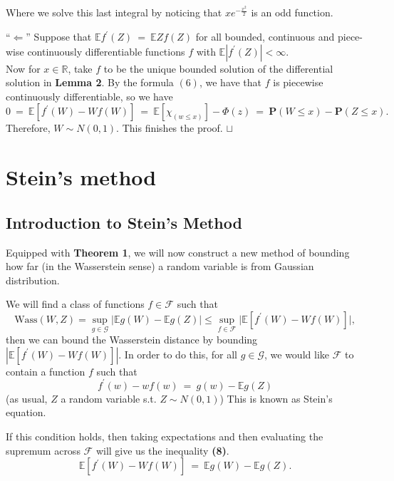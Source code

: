 \documentclass[12pt]{article}
\newcommand\qed{\hfill\hbox{\rlap{$\sqcap$}$\sqcup$}}
\newcommand{\eq }{\: = \:}
\theoremstyle{nonumberplain}
\begin{document}
Where we solve this last integral by noticing that $xe^{-\frac{x^2}{2}}$ is an odd function.

``$\Longleftarrow$'' Suppose that $\mathbb{E}f^{\prime}(Z)\eq \mathbb{E}Zf(Z)$ for all bounded, continuous and piece-wise continuously differentiable functions $f$ with $\mathbb{E}|f^{\prime}(Z)|<\infty$.\\
Now for $x \in \mathbb{R}$, take $f$ to be the unique bounded solution of the differential solution in \textbf{Lemma 2}. By the formula $(6)$, we have that $f$ is piecewise continuously differentiable, so we have 
$$
0\eq  \mathbb{E}[f^{\prime}(W)-Wf(W)] \eq  \mathbb{E}[\chi_{(w\leq x)}]-\Phi(z)\eq \textbf{P}(W\leq x)-\textbf{P}(Z\leq x).
$$
Therefore, $W\sim N(0,1)$. This finishes the proof.
\qed

\section{Stein's method}

\subsection{Introduction to Stein's Method}

Equipped with \textbf{Theorem 1}, we will now construct a new method of bounding how far (in the Wasserstein sense) a random variable is from Gaussian distribution.

We will find a class of functions $f\in \mathcal{F}$ such that 
\begin{equation}
\mathrm{Wass}(W, Z) = 
\sup \limits_{g\in \mathcal{G}} \bigl|\mathbb{E}g(W)-\mathbb{E}g(Z)\bigr|\leq \sup \limits_{f\in \mathcal{F}} \bigl|\mathbb{E}[f^{\prime}(W)-Wf(W)]\bigr|,
\end{equation}
then we can bound the Wasserstein distance by bounding $|\mathbb{E}[f^{\prime}(W)-Wf(W)]|$.
In order to do this, for all $g \in \mathcal{G}$, we would like $\mathcal{F}$ to contain a function $f$ such that
\begin{equation}
f^{\prime}(w)-wf(w)\eq g(w)-\mathbb{E}g(Z)
\end{equation}
(as usual, $Z$ a random variable s.t. $Z \sim N(0, 1)$) This is known as Stein's equation.

If this condition holds, then taking expectations and then evaluating the supremum across $\mathcal{F}$ will give us the inequality \textbf{(8)}.
\begin{equation}
\mathbb{E}[f^{\prime}(W)-Wf(W)]\eq \mathbb{E}g(W)-\mathbb{E}g(Z).
\end{equation}
\end{document}
